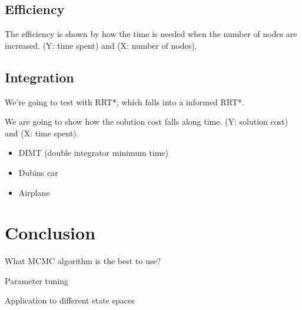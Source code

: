 \documentclass[letterpaper, 10 pt, conference]{ieeeconf}  %
\begin{document}
\subsection{Efficiency}

The efficiency is shown by how the time is needed when the number of nodes are increased.
(Y: time spent) and (X: number of nodes).

\subsection{Integration}

We're going to test with RRT*, which falls into a informed RRT*.

We are going to show how the solution cost falls along time.
(Y: solution cost) and (X: time spent).

\begin{itemize}
\item DIMT (double integrator minimum time)
\item Dubins car
\item Airplane
\end{itemize}

\section{Conclusion}

What MCMC algorithm is the best to use?

Parameter tuning

Application to different state spaces
\end{document}
